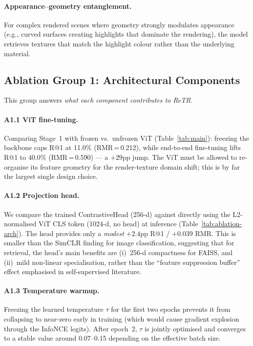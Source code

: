 \documentclass[10pt,twocolumn]{article}
\begin{document}
\paragraph{Appearance–geometry entanglement.}
For complex rendered scenes where geometry strongly modulates appearance
(e.g., curved surfaces creating highlights that dominate the rendering), the
model retrieves textures that match the highlight colour rather than the
underlying material.

\subsection{Ablation Group 1: Architectural Components}
\label{sec:ablation-arch}

This group answers \emph{what each component contributes to ReTR}.

\paragraph{A1.1 ViT fine-tuning.}
Comparing Stage~1 with frozen vs.\ unfrozen ViT (Table~\ref{tab:main}):
freezing the backbone caps R@1 at 11.0\% (RMR\,=\,0.212), while end-to-end
fine-tuning lifts R@1 to 40.0\% (RMR\,=\,0.590) --- a $+29$pp jump.
The ViT must be allowed to re-organise its feature geometry for the
render-texture domain shift; this is by far the largest single design
choice.

\paragraph{A1.2 Projection head.}
We compare the trained ContrastiveHead (256-d) against directly using the
L2-normalised ViT CLS token (1024-d, no head) at inference
(Table~\ref{tab:ablation-arch}).
The head provides only a \emph{modest} $+2.4$pp R@1 / $+0.039$ RMR.
This is smaller than the SimCLR finding for image classification, suggesting
that for retrieval, the head's main benefits are (i)~256-d compactness for
FAISS, and (ii)~mild non-linear specialisation, rather than the
``feature suppression buffer'' effect emphasised in self-supervised
literature.

\paragraph{A1.3 Temperature warmup.}
Freezing the learned temperature $\tau$ for the first two epochs prevents
it from collapsing to near-zero early in training (which would cause
gradient explosion through the InfoNCE logits).
After epoch~2, $\tau$ is jointly optimised and converges to a stable value
around 0.07--0.15 depending on the effective batch size.
\end{document}
